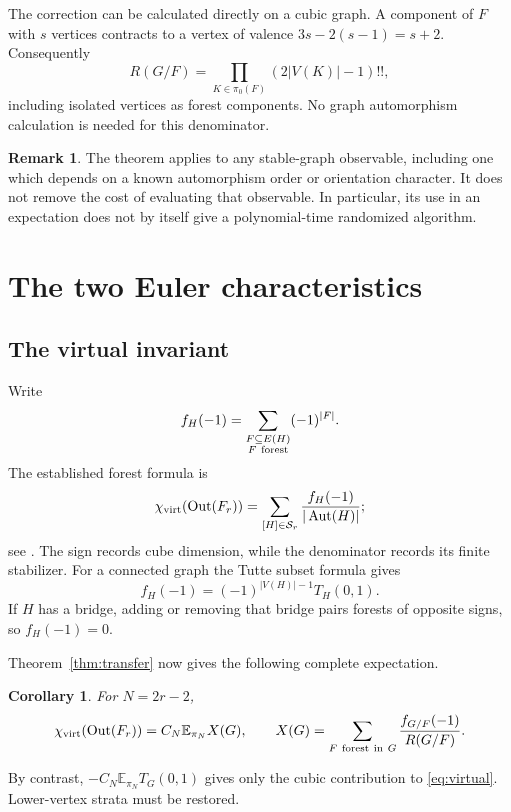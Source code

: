\documentclass[11pt]{article}
\newtheorem{corollary}[theorem]{Corollary}
\theoremstyle{definition}
\newtheorem{remark}[theorem]{Remark}
\newcommand{\Aut}{\operatorname{Aut}}
\newcommand{\Out}{\operatorname{Out}}
\newcommand{\E}{\mathbb E}
\numberwithin{equation}{section}
\begin{document}
The correction can be calculated directly on a cubic graph.
A component of $F$ with $s$ vertices contracts to a vertex of valence
$3s-2(s-1)=s+2$. Consequently
\begin{equation}\label{eq:components}
 R(G/F)=\prod_{K\in\pi_0(F)}(2|V(K)|-1)!!,
\end{equation}
including isolated vertices as forest components.
No graph automorphism calculation is needed for this denominator.

\begin{remark}
The theorem applies to any stable-graph observable, including one
which depends on a known automorphism order or orientation character.
It does not remove the cost of evaluating that observable.
In particular, its use in an expectation does not by itself give a
polynomial-time randomized algorithm.
\end{remark}

\section{The two Euler characteristics}

\subsection{The virtual invariant}
Write
\[
 f_H(-1)=\sum_{\substack{F\subseteq E(H)\\F\ {\rm forest}}}(-1)^{|F|}.
\]
The established forest formula is
\begin{equation}\label{eq:virtual}
 \chi_{\rm virt}(\Out(F_r))
       =\sum_{[H]\in\mathcal S_r}\frac{f_H(-1)}{|\Aut(H)|};
\end{equation}
see \cite[Section 4]{BVQFT}. The sign records cube dimension, while
the denominator records its finite stabilizer.
For a connected graph the Tutte subset formula gives
\[
 f_H(-1)=(-1)^{|V(H)|-1}T_H(0,1).
\]
If $H$ has a bridge, adding or removing that bridge pairs forests of
opposite signs, so $f_H(-1)=0$.

Theorem~\ref{thm:transfer} now gives the following complete expectation.
\begin{corollary}\label{cor:virtual}
For $N=2r-2$,
\[
 \chi_{\rm virt}(\Out(F_r))=C_N\E_{\pi_N}X(G),\qquad
 X(G)=\sum_{F\ {\rm forest\ in}\ G}\frac{f_{G/F}(-1)}{R(G/F)}.
\]
\end{corollary}
By contrast, $-C_N\E_{\pi_N}T_G(0,1)$ gives only the cubic contribution
to \eqref{eq:virtual}. Lower-vertex strata must be restored.
\end{document}

